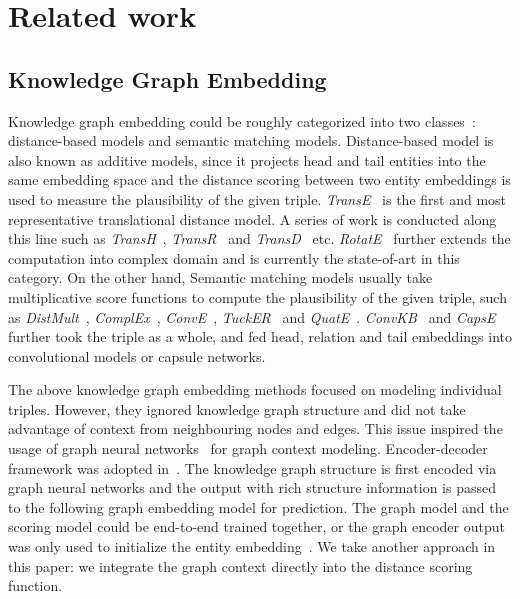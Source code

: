 \documentclass[11pt,a4paper]{article}
\begin{document}
\section{Related work}\label{sec:related}
\subsection{Knowledge Graph Embedding}
Knowledge graph embedding could be roughly categorized into two classes~\cite{Wang2017KnowledgeGE}: distance-based models and semantic matching models. Distance-based model is also known as additive models, since it projects head and tail entities into the same embedding space and the distance scoring between two entity embeddings is used to measure the plausibility of the given triple. {\it TransE}~\cite{bordes2013translating} is the first and most representative translational distance model. A series of work is conducted along this line such as {\it TransH}~\cite{wang2014knowledge}, {\it TransR}~\cite{lin2015learning} and {\it TransD}~\cite{Ji2015KnowledgeGE} etc. {\it RotatE}~\cite{Sun2019RotatEKG} further extends the computation into complex domain and is currently the state-of-art in this category. On the other hand, Semantic  matching  models usually take multiplicative score functions to compute the plausibility of the given triple, such as {\it DistMult}~\cite{yang2014distmult}, {\it ComplEx}~\cite{trouillon2016complex}, {\it ConvE}~\cite{dettmers2017conve}, {\it TuckER}~\cite{balazevic-etal-2019-tucker} and {\it QuatE}~\cite{zhang2019quaternion}. {\it ConvKB}~\cite{nguyen2017novel} and {\it CapsE}~\cite{Nguyen2019CapsE} further took the triple as a whole, and fed head, relation and tail embeddings into convolutional models or capsule networks. 


The above knowledge graph embedding methods focused on modeling individual triples.
However, they ignored knowledge graph structure and did not take advantage of context from neighbouring nodes and edges. This issue inspired the usage of graph neural networks~\cite{kipf2016semi,velivckovic2017graph} for graph context modeling. 
Encoder-decoder framework was adopted in~\cite{Schlichtkrull2017ModelingRD,Shang2019EndtoEndSC,Bansal2019A2NAT}. The knowledge graph structure is first encoded via graph neural networks and the output with rich structure information is passed to the following graph embedding model for prediction. The graph model and the scoring model could be end-to-end trained together, or the graph encoder output was only used to initialize the entity embedding~\cite{Nathani2019LearningAE}. We take another approach in this paper: we integrate the graph context directly into the distance scoring function.
\end{document}

